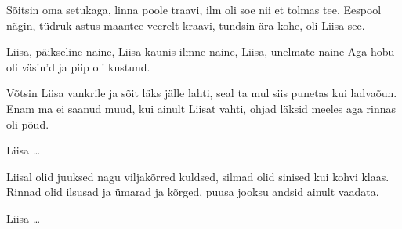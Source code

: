 S\~oitsin oma setukaga, linna poole traavi,
ilm oli soe nii et tolmas tee.
Eespool n\"agin, t\"udruk astus maantee veerelt kraavi,
tundsin \"ara kohe, oli Liisa see.

Liisa, p\"aikseline naine,
Liisa kaunis ilmne naine,
Liisa, unelmate naine
Aga hobu oli v\"asin'd ja piip oli kustund.

V\~otsin Liisa vankrile ja s\~oit l\"aks j\"alle lahti,
seal ta mul siis punetas kui ladva\~oun.
Enam ma ei saanud muud, kui ainult Liisat vahti,
ohjad l\"aksid meeles aga rinnas oli p\~oud.

Liisa \ldots

Liisal olid juuksed nagu viljak\~orred kuldsed,
silmad olid sinised kui kohvi klaas.
Rinnad olid ilsusad ja \"umarad ja k\~orged,
puusa jooksu andsid ainult vaadata.

Liisa \ldots